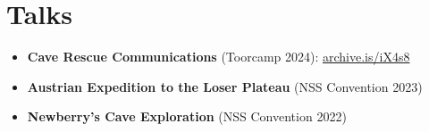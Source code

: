 \documentclass[letterpaper,12pt]{article}
\newcommand{\resumeTextListStart}{\begin{itemize}[leftmargin=0.15in, label={}]}
\newcommand{\resumeTextListEnd}{\end{itemize}}
\newcommand{\resumeTextItem}[1]{\item{\small #1}\vspace{-4pt}}
\begin{document}
\section{Talks}
  \resumeTextListStart
    \resumeTextItem{\textbf{Cave Rescue Communications} (Toorcamp 2024): \href{https://archive.is/iX4s8}{archive.is/iX4s8}}
    \resumeTextItem{\textbf{Austrian Expedition to the Loser Plateau} (NSS Convention 2023)}
    \resumeTextItem{\textbf{Newberry's Cave Exploration} (NSS Convention 2022)}
  \resumeTextListEnd



\end{document}
